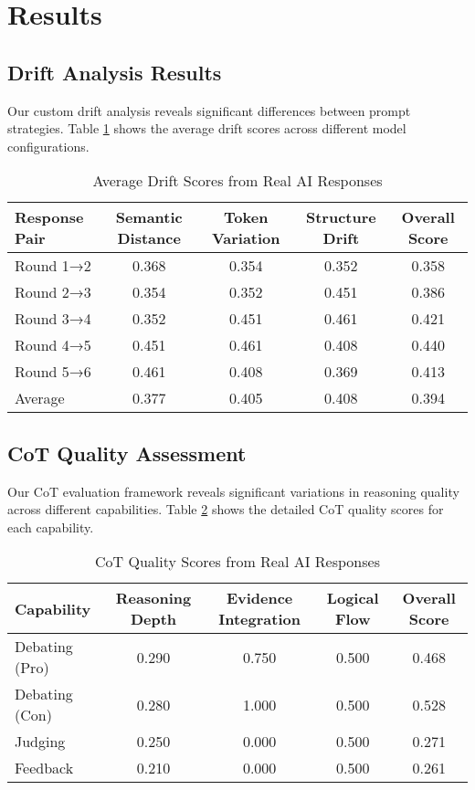 \documentclass[11pt]{article}
\begin{document}
\section{Results}

\subsection{Drift Analysis Results}

Our custom drift analysis reveals significant differences between prompt strategies. Table \ref{tab:drift_results} shows the average drift scores across different model configurations.

\begin{table}[h]
\centering
\caption{Average Drift Scores from Real AI Responses}
\label{tab:drift_results}
\begin{tabular}{lcccc}
\toprule
Response Pair & Semantic Distance & Token Variation & Structure Drift & Overall Score \\
\midrule
Round 1→2 & 0.368 & 0.354 & 0.352 & 0.358 \\
Round 2→3 & 0.354 & 0.352 & 0.451 & 0.386 \\
Round 3→4 & 0.352 & 0.451 & 0.461 & 0.421 \\
Round 4→5 & 0.451 & 0.461 & 0.408 & 0.440 \\
Round 5→6 & 0.461 & 0.408 & 0.369 & 0.413 \\
Average & 0.377 & 0.405 & 0.408 & 0.394 \\
\bottomrule
\end{tabular}
\end{table}

\subsection{CoT Quality Assessment}

Our CoT evaluation framework reveals significant variations in reasoning quality across different capabilities. Table \ref{tab:cot_quality} shows the detailed CoT quality scores for each capability.

\begin{table}[h]
\centering
\caption{CoT Quality Scores from Real AI Responses}
\label{tab:cot_quality}
\begin{tabular}{lcccc}
\toprule
Capability & Reasoning Depth & Evidence Integration & Logical Flow & Overall Score \\
\midrule
Debating (Pro) & 0.290 & 0.750 & 0.500 & 0.468 \\
Debating (Con) & 0.280 & 1.000 & 0.500 & 0.528 \\
Judging & 0.250 & 0.000 & 0.500 & 0.271 \\
Feedback & 0.210 & 0.000 & 0.500 & 0.261 \\
\bottomrule
\end{tabular}
\end{table}
\end{document}
